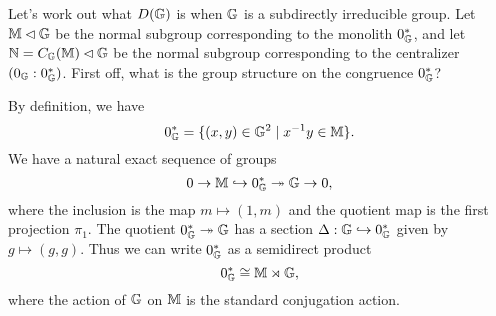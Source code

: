 \documentclass[letterpaper,11pt]{article}
\begin{document}
\begin{ex} Let's work out what $D(\mathbb{G})$ is when $\mathbb{G}$ is a subdirectly irreducible group. Let $\mathbb{M} \lhd \mathbb{G}$ be the normal subgroup corresponding to the monolith $0_{\mathbb{G}}^*$, and let $\mathbb{N} = C_{\mathbb{G}}(\mathbb{M}) \lhd \mathbb{G}$ be the normal subgroup corresponding to the centralizer $(0_{\mathbb{G}} : 0_{\mathbb{G}}^*)$. First off, what is the group structure on the congruence $0_{\mathbb{G}}^*$?

By definition, we have
\[
0_{\mathbb{G}}^* = \{(x,y) \in \mathbb{G}^2 \mid x^{-1}y \in \mathbb{M}\}.
\]
We have a natural exact sequence of groups
\[
0 \rightarrow \mathbb{M} \hookrightarrow 0_{\mathbb{G}}^* \twoheadrightarrow \mathbb{G} \rightarrow 0,
\]
where the inclusion is the map $m \mapsto (1,m)$ and the quotient map is the first projection $\pi_1$. The quotient $0_{\mathbb{G}}^* \twoheadrightarrow \mathbb{G}$ has a section $\Delta : \mathbb{G} \hookrightarrow 0_{\mathbb{G}}^*$ given by $g \mapsto (g,g)$. Thus we can write $0_{\mathbb{G}}^*$ as a semidirect product
\[
0_{\mathbb{G}}^* \cong \mathbb{M} \rtimes \mathbb{G},
\]
where the action of $\mathbb{G}$ on $\mathbb{M}$ is the standard conjugation action.


\end{ex}
\end{document}
